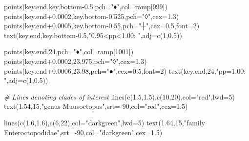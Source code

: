\documentclass[
]{article}
\newenvironment{Shaded}{\begin{snugshade}}{\end{snugshade}}
\newcommand{\AttributeTok}[1]{\textcolor[rgb]{0.77,0.63,0.00}{#1}}
\newcommand{\CommentTok}[1]{\textcolor[rgb]{0.56,0.35,0.01}{\textit{#1}}}
\newcommand{\DecValTok}[1]{\textcolor[rgb]{0.00,0.00,0.81}{#1}}
\newcommand{\FloatTok}[1]{\textcolor[rgb]{0.00,0.00,0.81}{#1}}
\newcommand{\FunctionTok}[1]{\textcolor[rgb]{0.00,0.00,0.00}{#1}}
\newcommand{\NormalTok}[1]{#1}
\newcommand{\SpecialCharTok}[1]{\textcolor[rgb]{0.00,0.00,0.00}{#1}}
\newcommand{\StringTok}[1]{\textcolor[rgb]{0.31,0.60,0.02}{#1}}
\begin{document}
\begin{Shaded}
\begin{Highlighting}[]
  \FunctionTok{points}\NormalTok{(key.end,key.bottom}\FloatTok{{-}0.5}\NormalTok{,}\AttributeTok{pch=}\StringTok{"♦"}\NormalTok{,}\AttributeTok{col=}\NormalTok{ramp[}\DecValTok{999}\NormalTok{])}
  \FunctionTok{points}\NormalTok{(key.end}\FloatTok{+0.0002}\NormalTok{,key.bottom}\FloatTok{{-}0.525}\NormalTok{,}\AttributeTok{pch=}\StringTok{"◊"}\NormalTok{,}\AttributeTok{cex=}\FloatTok{1.3}\NormalTok{)}
  \FunctionTok{points}\NormalTok{(key.end}\FloatTok{+0.0005}\NormalTok{,key.bottom}\FloatTok{{-}0.55}\NormalTok{,}\AttributeTok{pch=}\StringTok{"┼"}\NormalTok{,}\AttributeTok{cex=}\FloatTok{0.5}\NormalTok{,}\AttributeTok{font=}\DecValTok{2}\NormalTok{)}
  \FunctionTok{text}\NormalTok{(key.end,key.bottom}\FloatTok{{-}0.5}\NormalTok{,}\StringTok{"0.95\textless{}pp\textless{}1.00:  "}\NormalTok{,}\AttributeTok{adj=}\FunctionTok{c}\NormalTok{(}\DecValTok{1}\NormalTok{,}\FloatTok{0.5}\NormalTok{))}

  \FunctionTok{points}\NormalTok{(key.end,}\DecValTok{24}\NormalTok{,}\AttributeTok{pch=}\StringTok{"♦"}\NormalTok{,}\AttributeTok{col=}\NormalTok{ramp[}\DecValTok{1001}\NormalTok{])}
  \FunctionTok{points}\NormalTok{(key.end}\FloatTok{+0.0002}\NormalTok{,}\FloatTok{23.975}\NormalTok{,}\AttributeTok{pch=}\StringTok{"◊"}\NormalTok{,}\AttributeTok{cex=}\FloatTok{1.3}\NormalTok{)}
  \FunctionTok{points}\NormalTok{(key.end}\FloatTok{+0.0006}\NormalTok{,}\FloatTok{23.98}\NormalTok{,}\AttributeTok{pch=}\StringTok{"●"}\NormalTok{,}\AttributeTok{cex=}\FloatTok{0.5}\NormalTok{,}\AttributeTok{font=}\DecValTok{2}\NormalTok{)}
  \FunctionTok{text}\NormalTok{(key.end,}\DecValTok{24}\NormalTok{,}\StringTok{"pp=1.00:  "}\NormalTok{,}\AttributeTok{adj=}\FunctionTok{c}\NormalTok{(}\DecValTok{1}\NormalTok{,}\FloatTok{0.5}\NormalTok{))}

\CommentTok{\# Lines denoting clades of interest}
  \FunctionTok{lines}\NormalTok{(}\FunctionTok{c}\NormalTok{(}\FloatTok{1.5}\NormalTok{,}\FloatTok{1.5}\NormalTok{),}\FunctionTok{c}\NormalTok{(}\DecValTok{10}\NormalTok{,}\DecValTok{20}\NormalTok{),}\AttributeTok{col=}\StringTok{"red"}\NormalTok{,}\AttributeTok{lwd=}\DecValTok{5}\NormalTok{)}
  \FunctionTok{text}\NormalTok{(}\FloatTok{1.54}\NormalTok{,}\DecValTok{15}\NormalTok{,}\StringTok{"genus Muusoctopus"}\NormalTok{,}\AttributeTok{srt=}\SpecialCharTok{{-}}\DecValTok{90}\NormalTok{,}\AttributeTok{col=}\StringTok{"red"}\NormalTok{,}\AttributeTok{cex=}\FloatTok{1.5}\NormalTok{)}

  \FunctionTok{lines}\NormalTok{(}\FunctionTok{c}\NormalTok{(}\FloatTok{1.6}\NormalTok{,}\FloatTok{1.6}\NormalTok{),}\FunctionTok{c}\NormalTok{(}\DecValTok{6}\NormalTok{,}\DecValTok{22}\NormalTok{),}\AttributeTok{col=}\StringTok{"darkgreen"}\NormalTok{,}\AttributeTok{lwd=}\DecValTok{5}\NormalTok{)}
  \FunctionTok{text}\NormalTok{(}\FloatTok{1.64}\NormalTok{,}\DecValTok{15}\NormalTok{,}\StringTok{"family Enteroctopodidae"}\NormalTok{,}\AttributeTok{srt=}\SpecialCharTok{{-}}\DecValTok{90}\NormalTok{,}\AttributeTok{col=}\StringTok{"darkgreen"}\NormalTok{,}\AttributeTok{cex=}\FloatTok{1.5}\NormalTok{)}


\end{Highlighting}
\end{Shaded}
\end{document}
